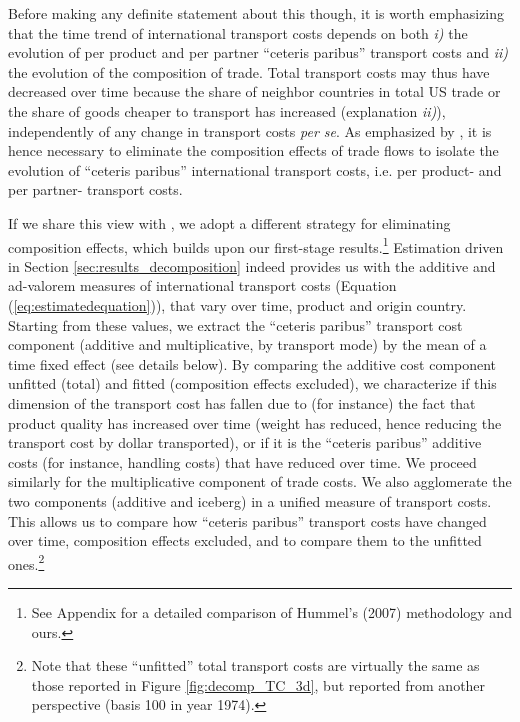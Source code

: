 \documentclass[a4paper,11pt]{article}
\begin{document}
Before making any definite statement about this though, it is worth emphasizing that the time trend of international transport costs depends on both \textit{i)} the evolution of per product and per partner ``ceteris paribus'' transport costs and \textit{ii)} the evolution of the composition of trade. Total transport costs may thus have decreased over time because the share of neighbor countries in total US trade or the share of goods cheaper to transport has increased (explanation \textit{ii)}), independently of any change in transport costs \textit{per se}. As emphasized by \cite{hummels2007}, it is hence necessary to eliminate the composition effects of trade flows to isolate the evolution of ``ceteris paribus'' international transport costs, i.e. per product- and per partner- transport costs.

If we share this view with \cite{hummels2007}, we adopt a different strategy for eliminating composition effects, which builds upon our first-stage results.\footnote{See Appendix for a detailed comparison of Hummel's (2007) methodology and ours.} Estimation driven in Section \ref{sec:results_decomposition} indeed provides us with the additive and ad-valorem measures of international transport costs (Equation (\ref{eq:estimatedequation})), that vary over time, product and origin country. Starting from these values, we extract the ``ceteris paribus'' transport cost component (additive and multiplicative, by transport mode) by the mean of a time fixed effect (see details below). By comparing the additive cost component unfitted (total) and fitted (composition effects excluded), we characterize if this dimension of the transport cost has fallen due to (for instance) the fact that product quality has increased over time (weight has reduced, hence reducing the transport cost by dollar transported), or if it is the ``ceteris paribus'' additive costs (for instance, handling costs) that have reduced over time. We proceed similarly for the multiplicative component of trade costs. We also agglomerate the two components (additive and iceberg) in a unified measure of transport costs. This allows us to compare how ``ceteris paribus'' transport costs have changed over time, composition effects excluded, and to compare them to the unfitted ones.\footnote{Note that these ``unfitted'' total transport costs are virtually the same as those reported in Figure \ref{fig:decomp_TC_3d}, but reported from another perspective (basis 100 in year 1974).}
\end{document}
